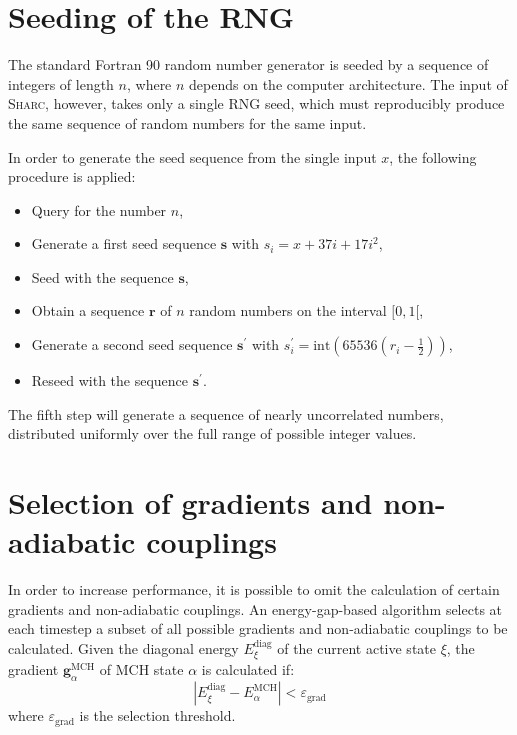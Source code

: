 \documentclass[a4paper,11pt,DIV=15,openany,twoside=false]{scrbook}
\newcommand{\sharc}{\textsc{Sharc}}
\newcommand{\VEC}[1]{\ensuremath{\mathbf{#1}}}
\begin{document}
\section{Seeding of the RNG}\label{met:seed}

The standard Fortran 90 random number generator is seeded by a sequence of integers of length $n$, where $n$ depends on the computer architecture. The input of \sharc, however, takes only a single RNG seed, which must reproducibly produce the same sequence of random numbers for the same input.

In order to generate the seed sequence from the single input $x$, the following procedure is applied:
\begin{itemize}
  \item Query for the number $n$,
  \item Generate a first seed sequence $\VEC{s}$ with $s_i=x+37i+17i^2$,
  \item Seed with the sequence $\VEC{s}$,
  \item Obtain a sequence $\VEC{r}$ of $n$ random numbers on the interval $[0,1[$,
  \item Generate a second seed sequence $\VEC{s}^\prime$ with $s_i^\prime=\text{int}\left(65536(r_i-\frac{1}{2})\right)$,
  \item Reseed with the sequence $\VEC{s}^\prime$.
\end{itemize}
The fifth step will generate a sequence of nearly uncorrelated numbers, distributed uniformly over the full range of possible integer values. 


\section{Selection of gradients and non-adiabatic couplings}\label{met:selection}

In order to increase performance, it is possible to omit the calculation of certain gradients and non-adiabatic couplings. An energy-gap-based algorithm selects at each timestep a subset of all possible gradients and non-adiabatic couplings to be calculated. Given the diagonal energy $E^{\text{diag}}_\xi$ of the current active state $\xi$, the gradient $\VEC{g}^{\text{MCH}}_\alpha$ of MCH state $\alpha$ is calculated if:
\begin{equation}
  \left|
    E^{\text{diag}}_\xi - E^{\text{MCH}}_\alpha
  \right|
  <
  \varepsilon_\text{grad}
\end{equation}
where $\varepsilon_\text{grad}$ is the selection threshold.
\end{document}
